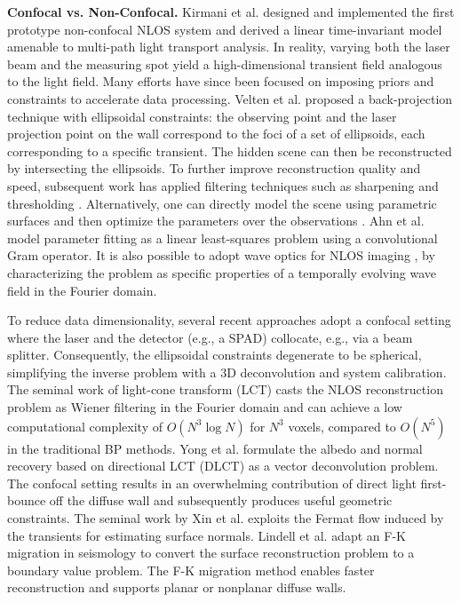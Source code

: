 \documentclass[10pt,journal,compsoc]{IEEEtran}
\begin{document}
\textbf{Confocal vs. Non-Confocal.} Kirmani et al. \cite{ 2011Kirmani, 2009Kirmani} designed and implemented the first prototype non-confocal NLOS system and derived a linear time-invariant model amenable to multi-path light transport analysis. In reality, varying both the laser beam and the measuring spot yield a high-dimensional transient field analogous to the light field. Many efforts have since been focused on imposing priors and constraints to accelerate data processing. Velten et al. \cite{2012Velten} proposed a back-projection technique with ellipsoidal constraints: the observing point and the laser projection point on the wall correspond to the foci of a set of ellipsoids, each corresponding to a specific transient. The hidden scene can then be reconstructed by intersecting the ellipsoids. To further improve reconstruction quality and speed, subsequent work has applied filtering techniques such as sharpening and thresholding \cite{2012Gupta, 2015Mauro, 2017Victor}. Alternatively, one can directly model the scene using parametric surfaces and then optimize the parameters over the observations \cite{2019Tsai, 2020ToG, 2019Ahn}. Ahn et al. \cite{2019Ahn} model parameter fitting as a linear least-squares problem using a convolutional Gram operator. It is also possible to adopt wave optics for NLOS imaging \cite{2019Reza, 2019Liu, 2019FK, 2020Liu}, by characterizing the problem as specific properties of a temporally evolving wave field in the Fourier domain.  

To reduce data dimensionality, several recent approaches adopt a confocal setting \cite{2018LCT, 2020DLCT} where the laser and the detector (e.g., a SPAD) collocate, e.g., via a beam splitter. Consequently, the ellipsoidal constraints degenerate to be spherical, simplifying the inverse problem with a 3D deconvolution and system calibration. The seminal work of light-cone transform (LCT) \cite{2018LCT} casts the NLOS reconstruction problem as Wiener filtering in the Fourier domain and can achieve a low computational complexity of $O(N^3\log{N})$ for $N^3$ voxels, compared to $O(N^5)$ in the traditional BP methods. Yong et al. \cite{2020DLCT} formulate the albedo and normal recovery based on directional LCT (DLCT) as a vector deconvolution problem. The confocal setting results in an overwhelming contribution of direct light first-bounce off the diffuse wall and subsequently produces useful geometric constraints. The seminal work by Xin et al. \cite{2019Xin} exploits the Fermat flow induced by the transients for estimating surface normals. Lindell et al. \cite{2019FK} adapt an F-K migration in seismology to convert the surface reconstruction problem to a boundary value problem. The F-K migration method enables faster reconstruction and supports planar or nonplanar diffuse walls. 
\end{document}
